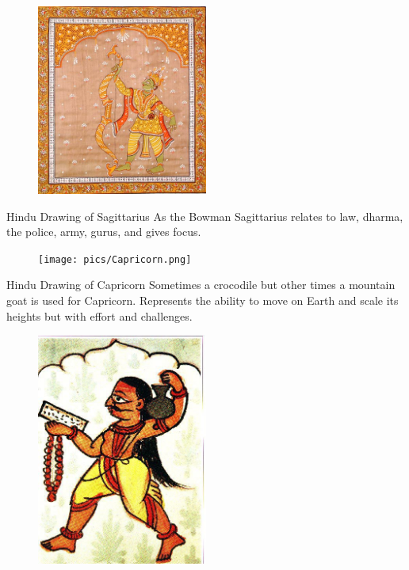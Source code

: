 \begin{figure}[H]
 \centering
\includegraphics[width=0.5\textwidth]{pics/Sagitarius.png}
 \end{figure}


Hindu Drawing of Sagittarius
As the Bowman
Sagittarius relates to law, dharma, the police, army, gurus, and gives focus.

 

\begin{figure}[H]
 \centering
\texttt{[image: pics/Capricorn.png]}
 \end{figure}

 

Hindu Drawing of Capricorn
Sometimes a crocodile but other times a mountain goat is used for Capricorn.
Represents the ability to move on Earth and scale its heights but with effort and challenges.

 

\begin{figure}[H]
 \centering
\includegraphics[width=0.5\textwidth]{pics/Aquarius.png}
 \end{figure}

